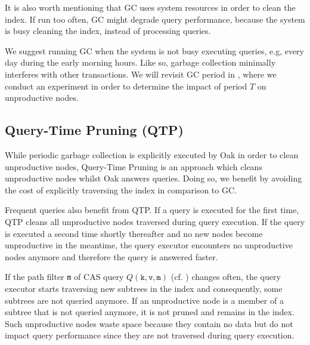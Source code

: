 \documentclass[abstracton,12pt]{scrartcl}
\theoremstyle{definition}
\begin{document}
It is also worth mentioning that GC uses system resources in order to clean the
index. If run too often, GC might degrade query performance, because the system
is busy cleaning the index, instead of processing queries.

We suggest running GC when the system is not busy executing queries, e.g, every
day during the 
early morning hours. Like so, garbage collection minimally interferes with other
transactions. We will revisit GC period in , where we
conduct an experiment in order to determine the impact of period $T$ on
unproductive nodes. 

\subsection{Query-Time Pruning (QTP)}

While periodic garbage collection is explicitly executed by Oak in order to
clean unproductive nodes, Query-Time Pruning is an approach which cleans
unproductive nodes whilst Oak answers queries. Doing so, we benefit by
avoiding the cost of explicitly traversing the index in comparison to GC.  

Frequent queries also benefit from QTP. If a query is executed for the first
time, QTP cleans all unproductive nodes traversed during query execution.
If the query is executed a second time shortly thereafter and no new nodes
become unproductive in the meantime, the query executor encounters no
unproductive nodes anymore and therefore the query is answered faster.

If the path filter \texttt{m} of CAS query $Q(\texttt{k},\texttt{v},\texttt{m})$
(cf. ) changes often, 
the query executor starts traversing new subtrees in the index
and consequently, some subtrees are not queried anymore. If an unproductive
node is a member of a subtree that is not queried anymore, it is not pruned and
remains in the index.
Such unproductive nodes waste space because they contain no data but do not
impact query performance since they are not traversed during query execution.

\end{document}
